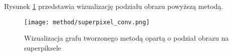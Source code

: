 {{{\begin{enumerate}
                Rysunek \ref{fig:method-vis-super} przedstawia wizualizację podziału obrazu powyższą metodą.

                \begin{figure}
                    \centering
                    \texttt{[image: method/superpixel\_conv.png]}
                    \caption{Wizualizacja grafu tworzonego metodą opartą o podział obrazu na superpiksele}
                    \label{fig:method-vis-super}
                \end{figure}
            \end{enumerate}
        }
    }
}

